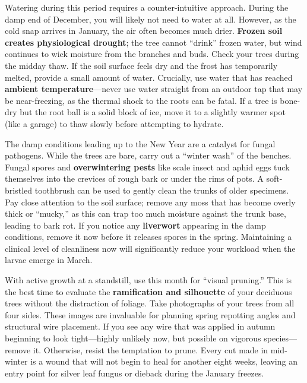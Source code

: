 \medskip
{}
\noindent
Watering during this period requires a counter\--intuitive approach.
During the damp end of December, you will likely not need to water at all.
However, as the cold snap arrives in January, the air often becomes much drier. \textbf{Frozen soil creates physiological drought}; the tree cannot ``drink'' frozen water, but wind continues to wick moisture from the branches and buds.
Check your trees during the midday thaw.
If the soil surface feels dry and the frost has temporarily melted, provide a small amount of water.
Crucially, use water that has reached \textbf{ambient temperature}---never use water straight from an outdoor tap that may be near\--freezing, as the thermal shock to the roots can be fatal.
If a tree is bone\--dry but the root ball is a solid block of ice, move it to a slightly warmer spot (like a garage) to thaw slowly before attempting to hydrate.

\medskip
{}
\noindent
The damp conditions leading up to the New Year are a catalyst for fungal pathogens.
While the trees are bare, carry out a ``winter wash'' of the benches.
Fungal spores and \textbf{overwintering pests} like scale insect and aphid eggs tuck themselves into the crevices of rough bark or under the rims of pots.
A soft\--bristled toothbrush can be used to gently clean the trunks of older specimens.
Pay close attention to the soil surface; remove any moss that has become overly thick or ``mucky,'' as this can trap too much moisture against the trunk base, leading to bark rot.
If you notice any \textbf{liverwort} appearing in the damp conditions, remove it now before it releases spores in the spring.
Maintaining a clinical level of cleanliness now will significantly reduce your workload when the larvae emerge in March.

\medskip
{}
\noindent
With active growth at a standstill, use this month for ``visual pruning.''
This is the best time to evaluate the \textbf{ramification and silhouette} of your deciduous trees without the distraction of foliage.
Take photographs of your trees from all four sides.
These images are invaluable for planning spring repotting angles and structural wire placement.
If you see any wire that was applied in autumn beginning to look tight---highly unlikely now, but possible on vigorous species---remove it.
Otherwise, resist the temptation to prune.
Every cut made in mid\--winter is a wound that will not begin to heal for another eight weeks, leaving an entry point for silver leaf fungus or dieback during the January freezes.

